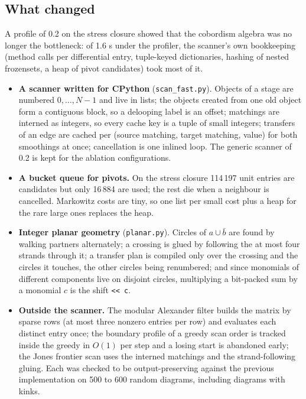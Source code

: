 \subsection{What changed}
A profile of 0.2 on the stress closure showed that the cobordism algebra was no
longer the bottleneck: of 1.6 s under the profiler, the scanner's own
bookkeeping (method calls per differential entry, tuple-keyed dictionaries,
hashing of nested frozensets, a heap of pivot candidates) took most of it.
\begin{itemize}
\item \textbf{A scanner written for CPython} (\texttt{scan\_fast.py}). Objects
  of a stage are numbered $0,\dots,N-1$ and live in lists; the objects created
  from one old object form a contiguous block, so a delooping label is an
  offset; matchings are interned as integers, so every cache key is a tuple of
  small integers; transfers of an edge are cached per (source matching, target
  matching, value) for both smoothings at once; cancellation is one inlined
  loop. The generic scanner of 0.2 is kept for the ablation configurations.
\item \textbf{A bucket queue for pivots.} On the stress closure 114\,197 unit
  entries are candidates but only 16\,884 are used; the rest die when a
  neighbour is cancelled. Markowitz costs are tiny, so one list per small cost
  plus a heap for the rare large ones replaces the heap.
\item \textbf{Integer planar geometry} (\texttt{planar.py}). Circles of
  $a\cup\bar b$ are found by walking partners alternately; a crossing is glued
  by following the at most four strands through it; a transfer plan is compiled
  only over the crossing and the circles it touches, the other circles being
  renumbered; and since monomials of different components live on disjoint
  circles, multiplying a bit-packed sum by a monomial $c$ is the shift
  \texttt{<{}< c}.
\item \textbf{Outside the scanner.} The modular Alexander filter builds the
  matrix by sparse rows (at most three nonzero entries per row) and evaluates
  each distinct entry once; the boundary profile of a greedy scan order is
  tracked inside the greedy in $O(1)$ per step and a losing start is abandoned
  early; the Jones frontier scan uses the interned matchings and the
  strand-following gluing. Each was checked to be output-preserving against the
  previous implementation on 500 to 600 random diagrams, including diagrams
  with kinks.
\end{itemize}

